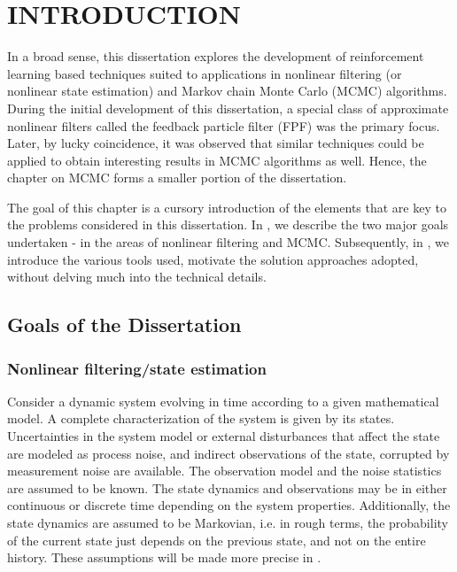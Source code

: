 \chapter{INTRODUCTION} 
\label{ch:intro}

In a broad sense, this dissertation explores the development of reinforcement learning based techniques suited to applications in nonlinear filtering (or nonlinear state estimation) and Markov chain Monte Carlo (MCMC) algorithms. During the initial development of this dissertation, a special class of approximate nonlinear filters called the feedback particle filter (FPF) was the primary focus. Later, by lucky coincidence, it was observed that similar techniques could be applied to obtain interesting results in MCMC algorithms as well.  Hence, the chapter on MCMC forms a smaller portion of the dissertation. 

The goal of this chapter is a cursory introduction of the elements that are key to the problems considered in this dissertation. In , we describe the two major goals undertaken - in the areas of nonlinear filtering and MCMC. Subsequently, in , we introduce the various tools used, motivate the solution approaches adopted, without delving much into the technical details. 
\section{Goals of the Dissertation}
\label{s:goals}
\subsection{Nonlinear filtering/state estimation}
\label{s:filtering}
Consider a dynamic system evolving in time according to a given mathematical model. A complete characterization of the system is given by its states. Uncertainties in the system model or external disturbances that affect the state are modeled as process noise, and indirect observations of the state, corrupted by measurement noise are available. The observation model and the noise statistics are assumed to be known. The state dynamics and observations may be in either continuous or discrete time depending on the system properties. Additionally, the state dynamics are assumed to be Markovian, i.e. in rough terms, the probability of the current state just depends on the previous state, and not on the entire history. These assumptions will be made more precise in . 

